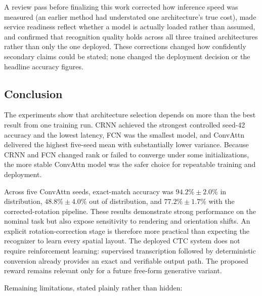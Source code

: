 \documentclass[10pt]{article}
\begin{document}
A review pass before finalizing this work corrected how inference speed was
measured (an earlier method had understated one architecture's true cost), made
service readiness reflect whether a model is actually loaded rather than assumed,
and confirmed that recognition quality holds across all three trained architectures
rather than only the one deployed. These corrections changed how confidently
secondary claims could be stated; none changed the deployment decision or the
headline accuracy figures.

\subsection{Conclusion}

The experiments show that architecture selection depends on more than the best result
from one training run. CRNN achieved the strongest controlled seed-42 accuracy and the
lowest latency, FCN was the smallest model, and ConvAttn delivered the highest
five-seed mean with substantially lower variance. Because CRNN and FCN changed rank or
failed to converge under some initializations, the more stable ConvAttn model was the
safer choice for repeatable training and deployment.

Across five ConvAttn seeds, exact-match accuracy was
$94.2\%\pm2.0\%$ in distribution, $48.8\%\pm4.0\%$ out of distribution, and
$77.2\%\pm1.7\%$ with the corrected-rotation pipeline. These results demonstrate strong
performance on the nominal task but also expose sensitivity to rendering and
orientation shifts. An explicit rotation-correction stage is therefore more practical
than expecting the recognizer to learn every spatial layout. The deployed CTC system
does not require reinforcement learning: supervised transcription followed by
deterministic conversion already provides an exact and verifiable output path. The
proposed reward remains relevant only for a future free-form generative variant.

Remaining limitations, stated plainly rather than hidden:
\end{document}
